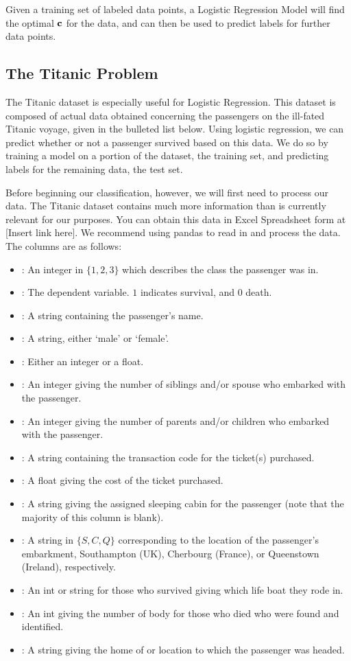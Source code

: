 Given a training set of labeled data points, a Logistic Regression Model will find the optimal $\bf{c}$ for the data, and can then be used to predict labels for further data points.

\subsection*{The Titanic Problem}
The Titanic dataset is especially useful for Logistic Regression.  This dataset is composed of actual data obtained concerning the passengers on the ill-fated Titanic voyage, given in the bulleted list below.  Using logistic regression, we can predict whether or not a passenger survived based on this data.  We do so by training a model on a portion of the dataset, the training set, and predicting labels for the remaining data, the test set.

Before beginning our classification, however, we will first need to process our data.  The Titanic dataset contains much more information than is currently relevant for our purposes.  You can obtain this data in Excel Spreadsheet form at [Insert link here].  We recommend using pandas to read in and process the data.  The columns are as follows:
\begin{itemize}
\item {}: An integer in $\{1, 2, 3\}$ which describes the class the passenger was in.
\item {}:  The dependent variable.  $1$ indicates survival, and $0$ death.
\item {}: A string containing the passenger's name.
\item {}: A string, either `male' or `female'.
\item {}: Either an integer or a float.
\item {}: An integer giving the number of siblings and/or spouse who embarked with the passenger.
\item {}: An integer giving the number of parents and/or children who embarked with the passenger.
\item {}: A string containing the transaction code for the ticket(s) purchased.
\item {}: A float giving the cost of the ticket purchased.
\item {}: A string giving the assigned sleeping cabin for the passenger (note that the majority of this column is blank).
\item {}: A string in $\{S, C, Q\}$ corresponding to the location of the passenger's embarkment, Southampton (UK), Cherbourg (France), or Queenstown (Ireland), respectively.
\item {}: An int or string for those who survived giving which life boat they rode in.
\item {}: An int giving the number of body for those who died who were found and identified.
\item {}: A string giving the home of or location to which the passenger was headed.
\end{itemize}

